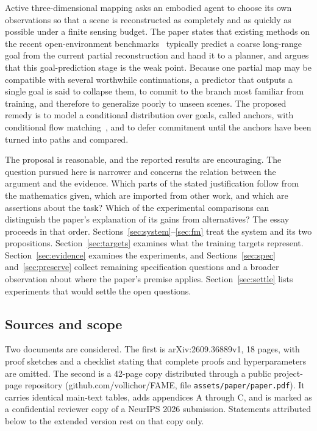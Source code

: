 \documentclass[11pt]{article}
\theoremstyle{plain}
\theoremstyle{remark}
\begin{document}
Active three-dimensional mapping asks an embodied agent to choose its own observations so that a scene is reconstructed as completely and as quickly as possible under a finite sensing budget. The paper states that existing methods on the recent open-environment benchmarks~\cite{nbp2025,gleam2025} typically predict a coarse long-range goal from the current partial reconstruction and hand it to a planner, and argues that this goal-prediction stage is the weak point. Because one partial map may be compatible with several worthwhile continuations, a predictor that outputs a single goal is said to collapse them, to commit to the branch most familiar from training, and therefore to generalize poorly to unseen scenes. The proposed remedy is to model a conditional distribution over goals, called anchors, with conditional flow matching~\cite{lipman2023flow}, and to defer commitment until the anchors have been turned into paths and compared.

The proposal is reasonable, and the reported results are encouraging. The question pursued here is narrower and concerns the relation between the argument and the evidence. Which parts of the stated justification follow from the mathematics given, which are imported from other work, and which are assertions about the task? Which of the experimental comparisons can distinguish the paper's explanation of its gains from alternatives? The essay proceeds in that order. Sections~\ref{sec:system}--\ref{sec:fm} treat the system and its two propositions. Section~\ref{sec:targets} examines what the training targets represent. Section~\ref{sec:evidence} examines the experiments, and Sections~\ref{sec:spec} and~\ref{sec:preserve} collect remaining specification questions and a broader observation about where the paper's premise applies. Section~\ref{sec:settle} lists experiments that would settle the open questions.

\subsection*{Sources and scope}

Two documents are considered. The first is arXiv:2609.36889v1, 18 pages, with proof sketches and a checklist stating that complete proofs and hyperparameters are omitted. The second is a 42-page copy distributed through a public project-page repository (github.com/vollichor/FAME, file \texttt{assets/paper/paper.pdf}). It carries identical main-text tables, adds appendices A through C, and is marked as a confidential reviewer copy of a NeurIPS 2026 submission. Statements attributed below to the extended version rest on that copy only.
\end{document}
